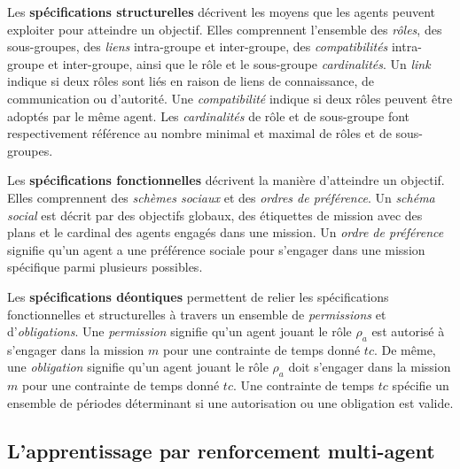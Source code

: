 \documentclass[contribution]{jfsma}
\begin{document}
Les \textbf{spécifications structurelles} décrivent les moyens que les agents peuvent exploiter pour atteindre un objectif. Elles comprennent l'ensemble des \emph{rôles}, des sous-groupes, des \emph{liens} intra-groupe et inter-groupe, des \emph{compatibilités} intra-groupe et inter-groupe, ainsi que le rôle et le sous-groupe \emph {cardinalités}.
Un \emph{link} indique si deux rôles sont liés en raison de liens de connaissance, de communication ou d'autorité. Une \emph{compatibilité} indique si deux rôles peuvent être adoptés par le même agent. Les \emph{cardinalités} de rôle et de sous-groupe font respectivement référence au nombre minimal et maximal de rôles et de sous-groupes.

Les \textbf{spécifications fonctionnelles} décrivent la manière d'atteindre un objectif. Elles comprennent des \emph{schèmes sociaux} et des \emph{ordres de préférence}. Un \emph{schéma social} est décrit par des objectifs globaux, des étiquettes de mission avec des plans et le cardinal des agents engagés dans une mission. Un \emph{ordre de préférence} signifie qu'un agent a une préférence sociale pour s'engager dans une mission spécifique parmi plusieurs possibles.

Les \textbf{spécifications déontiques} permettent de relier les spécifications fonctionnelles et structurelles à travers un ensemble de \emph{permissions} et d'\emph{obligations}. Une \emph{permission} signifie qu'un agent jouant le rôle $\rho_a$ est autorisé à s'engager dans la mission $m$ pour une contrainte de temps donné $tc$. De même, une \emph{obligation} signifie qu'un agent jouant le rôle $\rho_a$ doit s'engager dans la mission $m$ pour une contrainte de temps donné $tc$. Une contrainte de temps $tc $ spécifie un ensemble de périodes déterminant si une autorisation ou une obligation est valide.


\subsection{L'apprentissage par renforcement multi-agent}
\end{document}
